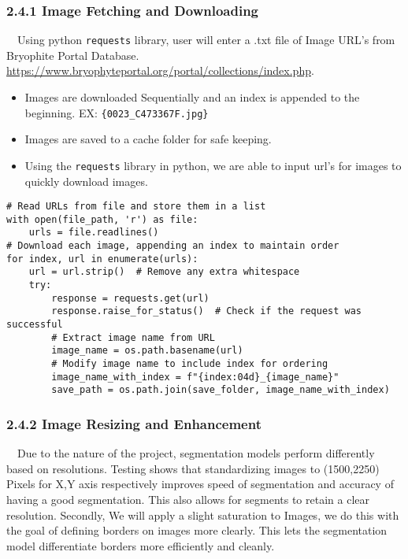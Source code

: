 \documentclass{article}
\begin{document}
\subsubsection*{2.4.1 Image Fetching and Downloading}
$\quad$Using python \texttt{requests} library, user will enter a .txt file of Image URL's from Bryophite Portal Database. \href{https://www.bryophyteportal.org/portal/collections/index.php}{https://www.bryophyteportal.org/portal/collections/index.php}. 

\begin{itemize}
\item Images are downloaded Sequentially and an index is appended to the beginning. EX: \verb|{0023_C473367F.jpg}|
\item Images are saved to a cache folder for safe keeping.
\item Using the \texttt{requests} library in python, we are able to input url's for images to quickly download images.
\end{itemize}

\begingroup\footnotesize
\begin{verbatim}
# Read URLs from file and store them in a list
with open(file_path, 'r') as file:
    urls = file.readlines()
# Download each image, appending an index to maintain order
for index, url in enumerate(urls):
    url = url.strip()  # Remove any extra whitespace
    try:
        response = requests.get(url)
        response.raise_for_status()  # Check if the request was successful
        # Extract image name from URL
        image_name = os.path.basename(url)
        # Modify image name to include index for ordering
        image_name_with_index = f"{index:04d}_{image_name}"
        save_path = os.path.join(save_folder, image_name_with_index)
\end{verbatim}
\endgroup

\subsubsection*{2.4.2 Image Resizing and Enhancement}
$\quad$Due to the nature of the project, segmentation models perform differently based on resolutions. Testing shows that standardizing images to (1500,2250) Pixels for X,Y axis respectively improves speed of segmentation and accuracy of having a good segmentation. This also allows for segments to retain a clear resolution. Secondly, We will apply a slight saturation to Images, we do this with the goal of defining borders on images more clearly. This lets the segmentation model differentiate borders more efficiently and cleanly. 
\end{document}
